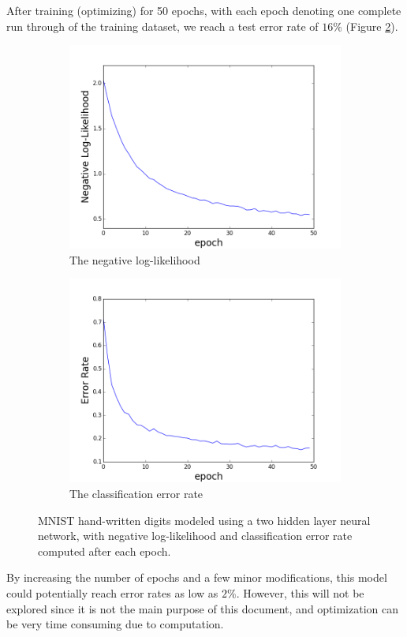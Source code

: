 After training (optimizing) for 50 epochs,
with each epoch denoting one complete run through of the training 
dataset,
we reach a test error rate of $16\%$ (Figure \ref{fig:mnist_err}).
%
\begin{figure}[h]
\centering
\begin{subfigure}{.45\textwidth}
  \centering
  \includegraphics[width=\linewidth]{fig_mnist_nll.png}
  \caption{The negative log-likelihood}
  \label{fig:mnist_nll}
\end{subfigure}%
\begin{subfigure}{.45\textwidth}
  \centering
  \includegraphics[width=\linewidth]{fig_mnist_err.png}
  \caption{The classification error rate}
  \label{fig:mnist_err}
\end{subfigure}
\caption{MNIST hand-written digits modeled using a two hidden
  layer neural network, with negative log-likelihood and
  classification error rate computed after each epoch.}
\label{fig:mnist_results}
\end{figure}
%
By increasing the number of epochs and a few minor modifications,
this model could potentially reach error rates as low as $2\%$.
However, this will not be explored since it is not
the main purpose of this document,
and optimization can be very time consuming due to computation.

